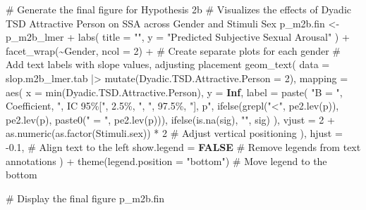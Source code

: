 \documentclass[
  bookmarksnumbered]{article}
\newenvironment{Shaded}{\begin{snugshade}}{\end{snugshade}}
\newcommand{\AttributeTok}[1]{\textcolor[rgb]{0.80,0.80,0.80}{#1}}
\newcommand{\CommentTok}[1]{\textcolor[rgb]{0.50,0.62,0.50}{#1}}
\newcommand{\ConstantTok}[1]{\textcolor[rgb]{0.86,0.64,0.64}{\textbf{#1}}}
\newcommand{\DecValTok}[1]{\textcolor[rgb]{0.86,0.86,0.80}{#1}}
\newcommand{\FloatTok}[1]{\textcolor[rgb]{0.75,0.75,0.82}{#1}}
\newcommand{\FunctionTok}[1]{\textcolor[rgb]{0.94,0.94,0.56}{#1}}
\newcommand{\NormalTok}[1]{\textcolor[rgb]{0.80,0.80,0.80}{#1}}
\newcommand{\OtherTok}[1]{\textcolor[rgb]{0.94,0.94,0.56}{#1}}
\newcommand{\SpecialCharTok}[1]{\textcolor[rgb]{0.86,0.64,0.64}{#1}}
\newcommand{\StringTok}[1]{\textcolor[rgb]{0.80,0.58,0.58}{#1}}
\begin{document}
\begin{Shaded}
\begin{Highlighting}[]
\CommentTok{\# Generate the final figure for Hypothesis 2b}
\CommentTok{\# Visualizes the effects of Dyadic TSD Attractive Person on SSA across Gender and Stimuli Sex}
\NormalTok{p\_m2b.fin }\OtherTok{\textless{}{-}}\NormalTok{ p\_m2b\_lmer }\SpecialCharTok{+}
  \FunctionTok{labs}\NormalTok{(}
    \AttributeTok{title =} \StringTok{""}\NormalTok{,}
    \AttributeTok{y =} \StringTok{"Predicted Subjective Sexual Arousal"}
\NormalTok{  ) }\SpecialCharTok{+}
  \FunctionTok{facet\_wrap}\NormalTok{(}\SpecialCharTok{\textasciitilde{}}\NormalTok{Gender, }\AttributeTok{ncol =} \DecValTok{2}\NormalTok{) }\SpecialCharTok{+} \CommentTok{\# Create separate plots for each gender}
  \CommentTok{\# Add text labels with slope values, adjusting placement}
  \FunctionTok{geom\_text}\NormalTok{(}
    \AttributeTok{data =}\NormalTok{ slop.m2b\_lmer.tab }\SpecialCharTok{|\textgreater{}} \FunctionTok{mutate}\NormalTok{(}\AttributeTok{Dyadic.TSD.Attractive.Person =} \DecValTok{2}\NormalTok{),}
    \AttributeTok{mapping =} \FunctionTok{aes}\NormalTok{(}
      \AttributeTok{x =} \FunctionTok{min}\NormalTok{(Dyadic.TSD.Attractive.Person), }\AttributeTok{y =} \ConstantTok{Inf}\NormalTok{,}
      \AttributeTok{label =} \FunctionTok{paste}\NormalTok{(}
        \StringTok{"B = "}\NormalTok{, Coefficient, }\StringTok{", IC 95\%["}\NormalTok{, }\StringTok{\textasciigrave{}}\AttributeTok{2.5\%}\StringTok{\textasciigrave{}}\NormalTok{, }\StringTok{", "}\NormalTok{, }\StringTok{\textasciigrave{}}\AttributeTok{97.5\%}\StringTok{\textasciigrave{}}\NormalTok{, }\StringTok{"], p"}\NormalTok{,}
        \FunctionTok{ifelse}\NormalTok{(}\FunctionTok{grepl}\NormalTok{(}\StringTok{"\textless{}"}\NormalTok{, }\FunctionTok{pe2.lev}\NormalTok{(p)), }\FunctionTok{pe2.lev}\NormalTok{(p), }\FunctionTok{paste0}\NormalTok{(}\StringTok{" = "}\NormalTok{, }\FunctionTok{pe2.lev}\NormalTok{(p))),}
        \FunctionTok{ifelse}\NormalTok{(}\FunctionTok{is.na}\NormalTok{(sig), }\StringTok{""}\NormalTok{, sig)}
\NormalTok{      ),}
      \AttributeTok{vjust =} \DecValTok{2} \SpecialCharTok{+} \FunctionTok{as.numeric}\NormalTok{(}\FunctionTok{as.factor}\NormalTok{(Stimuli.sex)) }\SpecialCharTok{*} \DecValTok{2} \CommentTok{\# Adjust vertical positioning}
\NormalTok{    ),}
    \AttributeTok{hjust =} \SpecialCharTok{{-}}\FloatTok{0.1}\NormalTok{, }\CommentTok{\# Align text to the left}
    \AttributeTok{show.legend =} \ConstantTok{FALSE} \CommentTok{\# Remove legends from text annotations}
\NormalTok{  ) }\SpecialCharTok{+}
  \FunctionTok{theme}\NormalTok{(}\AttributeTok{legend.position =} \StringTok{"bottom"}\NormalTok{) }\CommentTok{\# Move legend to the bottom}

\CommentTok{\# Display the final figure}
\NormalTok{p\_m2b.fin}
\end{Highlighting}
\end{Shaded}
\end{document}
